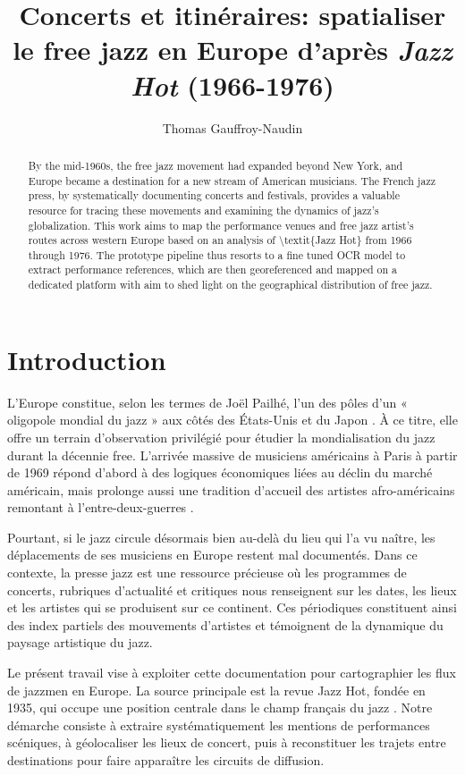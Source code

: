 \documentclass[fra, final]{anthology-ch}      %
\title{Concerts et itinéraires: spatialiser le free jazz en Europe d'après \textit{Jazz Hot} (1966-1976)}
\author[1]{Thomas Gauffroy-Naudin}[
orcid=0009-0003-5309-8515,
email=Thomas.Gauffroy-Naudin@unige.ch
]
\affiliation{1}{Université de Genève, Suisse}
\affiliation{2}{Music and Migration Lab, New York, United-States}
\begin{document}
	
	\maketitle
	
	\begin{abstract}
		By the mid-1960s, the free jazz movement had expanded beyond New York, and Europe became a destination for a new stream of American musicians. The French jazz press, by systematically documenting concerts and festivals, provides a valuable resource for tracing these movements and examining the dynamics of jazz’s globalization. This work aims to map the performance venues and free jazz artist's routes across western Europe based on an analysis of \textbackslash{}textit\{Jazz Hot\} from 1966 through 1976. The prototype pipeline thus resorts to a fine tuned OCR model to extract performance references, which are then georeferenced and mapped on a dedicated platform with aim to shed light on the geographical distribution of free jazz. \end{abstract}
	
	\section{Introduction}
	L'Europe constitue, selon les termes de Joël Pailhé, l'un des pôles d'un « oligopole mondial du jazz » aux côtés des États-Unis et du Japon \cite{pailhe_jazz_1998}. À ce titre, elle offre un terrain d'observation privilégié pour étudier la mondialisation du jazz durant la décennie free. L'arrivée massive de musiciens américains à Paris à partir de 1969 répond d'abord à des logiques économiques liées au déclin du marché américain, mais prolonge aussi une tradition d'accueil des artistes afro-américains remontant à l'entre-deux-guerres \cite{drott_free_2008}.
	
	Pourtant, si le jazz circule désormais bien au-delà du lieu qui l'a vu naître, les déplacements de ses musiciens en Europe restent mal documentés. Dans ce contexte, la presse jazz est une ressource précieuse où les programmes de concerts, rubriques d'actualité et critiques nous renseignent sur les dates, les lieux et les artistes qui se produisent sur ce continent. Ces périodiques constituent ainsi des index partiels des mouvements d'artistes et témoignent de la dynamique du paysage artistique du jazz. 
	
	Le présent travail vise à exploiter cette documentation pour cartographier les flux de jazzmen en Europe. La source principale est la revue Jazz Hot, fondée en 1935, qui occupe une position centrale dans le champ français du jazz \cite{roueff_espace_2019}. Notre démarche consiste à extraire systématiquement les mentions de performances scéniques, à géolocaliser les lieux de concert, puis à reconstituer les trajets entre destinations pour faire apparaître les circuits de diffusion.
	
\end{document}
